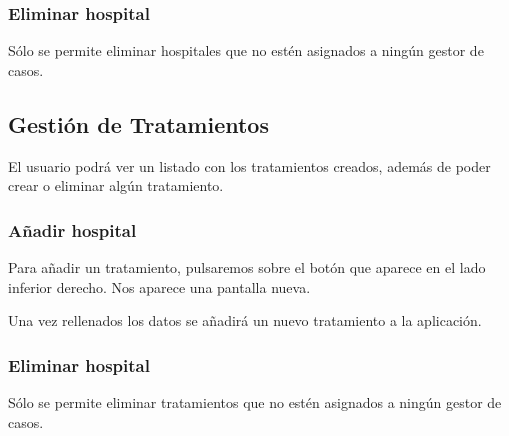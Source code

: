 \subsubsection{Eliminar hospital}
Sólo se permite eliminar hospitales que no estén asignados a ningún gestor de casos.

\subsection{Gestión de Tratamientos}
El usuario podrá ver un listado con los tratamientos creados, además de poder crear o eliminar algún tratamiento.

\subsubsection{Añadir hospital}
Para añadir un tratamiento, pulsaremos sobre el botón que aparece en el lado inferior derecho. Nos aparece una pantalla nueva.

Una vez rellenados los datos se añadirá un nuevo tratamiento a la aplicación.

\subsubsection{Eliminar hospital}
Sólo se permite eliminar tratamientos que no estén asignados a ningún gestor de casos.
